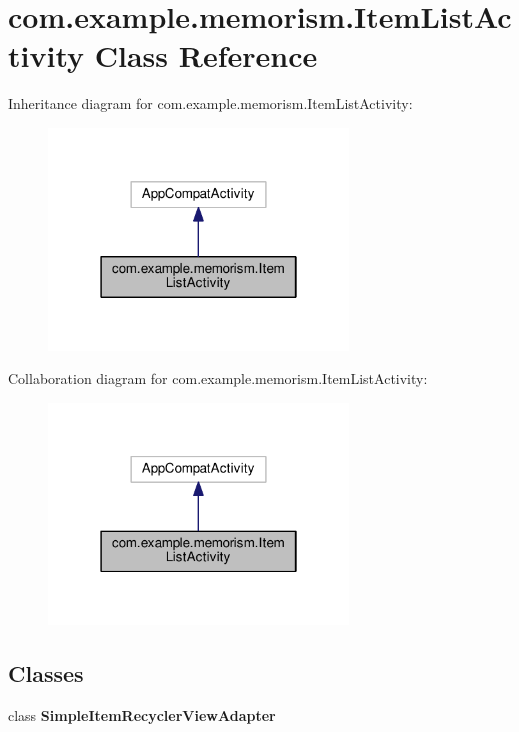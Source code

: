 \hypertarget{classcom_1_1example_1_1memorism_1_1_item_list_activity}{}\section{com.\+example.\+memorism.\+Item\+List\+Activity Class Reference}
\label{classcom_1_1example_1_1memorism_1_1_item_list_activity}


Inheritance diagram for com.\+example.\+memorism.\+Item\+List\+Activity\+:\nopagebreak
\begin{figure}[H]
\begin{center}
\leavevmode
\includegraphics[width=226pt]{d8/d6d/classcom_1_1example_1_1memorism_1_1_item_list_activity__inherit__graph}
\end{center}
\end{figure}


Collaboration diagram for com.\+example.\+memorism.\+Item\+List\+Activity\+:\nopagebreak
\begin{figure}[H]
\begin{center}
\leavevmode
\includegraphics[width=226pt]{d2/d58/classcom_1_1example_1_1memorism_1_1_item_list_activity__coll__graph}
\end{center}
\end{figure}
\subsection*{Classes}
\begin{DoxyCompactItemize}
\item 
class {\bfseries Simple\+Item\+Recycler\+View\+Adapter}
\end{DoxyCompactItemize}
